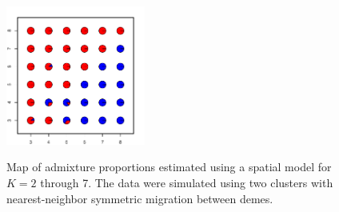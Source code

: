 \documentclass[12pt]{article}
\begin{document}
\begin{figure}
			{\includegraphics[width=1.8in,height=1.8in]{figs/sims/simK2_sp_pies_K7.pdf}}
	\caption{
	Map of admixture proportions estimated using a spatial model for $K=2$ through 7.
	The data were simulated using two clusters with nearest-neighbor symmetric migration between demes.
    }\label{simK2_sp_pies}
\end{figure}
\end{document}
